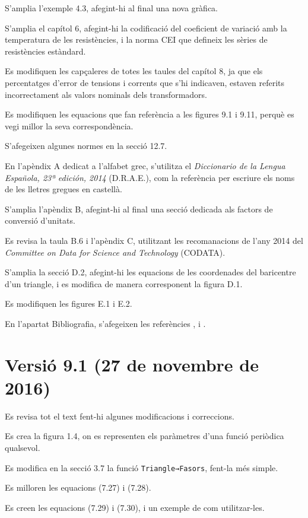 S'amplia l'exemple 4.3, afegint-hi al final  una nova gràfica.

S'amplia el capítol 6, afegint-hi la codificació del coeficient de variació amb la temperatura de les resistències, i la norma CEI que defineix les sèries de resistències estàndard.

Es modifiquen les capçaleres de totes les taules del capítol 8, ja que els percentatges d'error de tensions i corrents que s'hi indicaven, estaven referits incorrectament als valors nominals dels transformadors.

Es modifiquen les equacions que fan referència a les figures 9.1 i 9.11, perquè es vegi millor la seva correspondència.

S'afegeixen algunes normes en la secció 12.7.

En l'apèndix A dedicat a l'alfabet grec, s'utilitza el  
\textit{Diccionario de la Lengua Española, 23ª
edición, 2014} (D.R.A.E.), com la referència per escriure els noms de les lletres gregues en castellà.

S'amplia l'apèndix B, afegint-hi al final una secció dedicada als factors de conversió d'unitats.

Es revisa la taula B.6 i l'apèndix C, utilitzant les recomanacions de l'any 2014 del \textit{Committee on Data for Science and Technology} (CODATA).


S'amplia la secció D.2, afegint-hi les equacions de les coordenades del baricentre d'un triangle, i es modifica de manera corresponent la figura D.1.

Es modifiquen les figures E.1 i E.2.

En l'apartat Bibliografia, s'afegeixen les referències \cite{VOS}, \cite{WMF} i \cite{TRA}.


\section*{Versió 9.1 (27 de novembre de 2016)}

Es revisa tot el text fent-hi algunes  modificacions i correccions.

Es crea la figura 1.4, on es representen els paràmetres d'una funció periòdica qualsevol.

Es modifica en la secció 3.7 la funció \texttt{Triangle→Fasors}, fent-la més simple.

Es milloren les equacions (7.27) i (7.28).

Es creen les equacions (7.29) i (7.30), i un exemple de com utilitzar-les.

